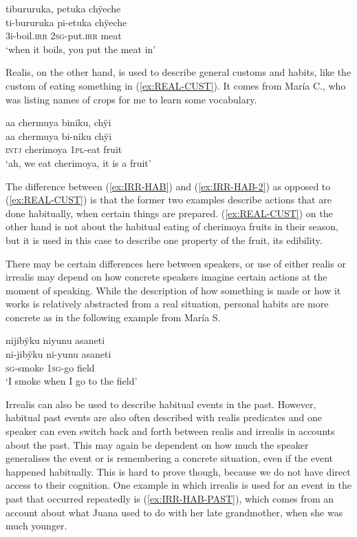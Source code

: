 \ea\label{ex:IRR-HAB-2}
\begingl 
\glpreamble tibururuka, petuka chÿeche\\
\gla ti-bururuka pi-etuka chÿeche\\ 
\glb 3i-boil.\textsc{irr} 2\textsc{sg}-put.\textsc{irr} meat\\ 
\glft ‘when it boils, you put the meat in’
 \trailingcitation{[jmx-d110918ls-1.010]}
\xe
{}

Realis, on the other hand, is used to describe general customs and habits, like the custom of eating something in (\ref{ex:REAL-CUST}). It comes from María C., who was listing names of crops for me to learn some vocabulary.

\ea\label{ex:REAL-CUST}
\begingl 
\glpreamble aa chermuya biniku, chÿi\\
\gla aa chermuya bi-niku chÿi\\ 
\glb \textsc{intj} cherimoya 1\textsc{pl}-eat fruit\\ 
\glft ‘ah, we eat cherimoya, it is a fruit’
 \trailingcitation{[uxx-p110825l.190]}
\xe
{}

The difference between (\ref{ex:IRR-HAB}) and (\ref{ex:IRR-HAB-2}) as opposed to (\ref{ex:REAL-CUST}) is that the former two examples describe actions that are done habitually, when certain things are prepared. (\ref{ex:REAL-CUST}) on the other hand is not about the habitual eating of cherimoya fruits in their season, but it is used in this case to describe one property of the fruit, its edibility.

There may be certain differences here between speakers, or use of either realis or irrealis may depend on how concrete speakers imagine certain actions at the moment of speaking. While the description of how something is made or how it works is relatively abstracted from a real situation, personal habits are more concrete as in the following example from María S.

\ea
\begingl 
\glpreamble nijibÿku niyunu asaneti\\
\gla ni-jibÿku ni-yunu asaneti\\ 
\textsc{sg}-smoke 1\textsc{sg}-go field\\ 
\glft ‘I smoke when I go to the field’
 \trailingcitation{[rxx-e120511l.390]}
\xe

Irrealis can also be used to describe habitual events in the past. However, habitual past events are also often described with realis predicates and one speaker can even switch back and forth between realis and irrealis in accounts about the past. This may again be dependent on how much the speaker generalises the event or is remembering a concrete situation, even if the event happened habitually. This is hard to prove though, because we do not have direct access to their cognition. One example in which irrealis is used for an event in the past that occurred repeatedly is (\ref{ex:IRR-HAB-PAST}), which comes from an account about what Juana used to do with her late grandmother, when she was much younger.

